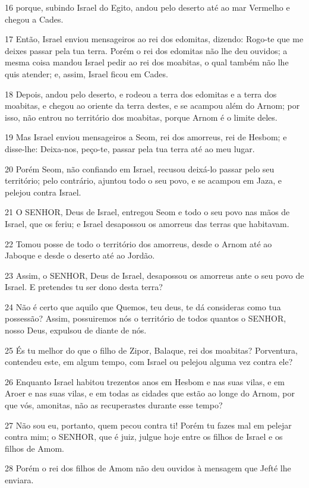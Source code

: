 \par 16 porque, subindo Israel do Egito, andou pelo deserto até ao mar Vermelho e chegou a Cades.
\par 17 Então, Israel enviou mensageiros ao rei dos edomitas, dizendo: Rogo-te que me deixes passar pela tua terra. Porém o rei dos edomitas não lhe deu ouvidos; a mesma coisa mandou Israel pedir ao rei dos moabitas, o qual também não lhe quis atender; e, assim, Israel ficou em Cades.
\par 18 Depois, andou pelo deserto, e rodeou a terra dos edomitas e a terra dos moabitas, e chegou ao oriente da terra destes, e se acampou além do Arnom; por isso, não entrou no território dos moabitas, porque Arnom é o limite deles.
\par 19 Mas Israel enviou mensageiros a Seom, rei dos amorreus, rei de Hesbom; e disse-lhe: Deixa-nos, peço-te, passar pela tua terra até ao meu lugar.
\par 20 Porém Seom, não confiando em Israel, recusou deixá-lo passar pelo seu território; pelo contrário, ajuntou todo o seu povo, e se acampou em Jaza, e pelejou contra Israel.
\par 21 O SENHOR, Deus de Israel, entregou Seom e todo o seu povo nas mãos de Israel, que os feriu; e Israel desapossou os amorreus das terras que habitavam.
\par 22 Tomou posse de todo o território dos amorreus, desde o Arnom até ao Jaboque e desde o deserto até ao Jordão.
\par 23 Assim, o SENHOR, Deus de Israel, desapossou os amorreus ante o seu povo de Israel. E pretendes tu ser dono desta terra?
\par 24 Não é certo que aquilo que Quemos, teu deus, te dá consideras como tua possessão? Assim, possuiremos nós o território de todos quantos o SENHOR, nosso Deus, expulsou de diante de nós.
\par 25 És tu melhor do que o filho de Zipor, Balaque, rei dos moabitas? Porventura, contendeu este, em algum tempo, com Israel ou pelejou alguma vez contra ele?
\par 26 Enquanto Israel habitou trezentos anos em Hesbom e nas suas vilas, e em Aroer e nas suas vilas, e em todas as cidades que estão ao longe do Arnom, por que vós, amonitas, não as recuperastes durante esse tempo?
\par 27 Não sou eu, portanto, quem pecou contra ti! Porém tu fazes mal em pelejar contra mim; o SENHOR, que é juiz, julgue hoje entre os filhos de Israel e os filhos de Amom.
\par 28 Porém o rei dos filhos de Amom não deu ouvidos à mensagem que Jefté lhe enviara.
